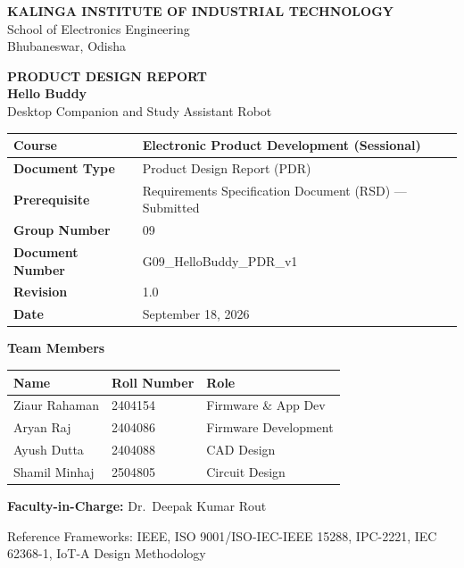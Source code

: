 \documentclass[12pt,a4paper]{article}
\begin{document}
\begin{titlepage}
\begin{center}

\vspace*{1cm}
{\large\bfseries KALINGA INSTITUTE OF INDUSTRIAL TECHNOLOGY}\\[0.2cm]
{\normalsize School of Electronics Engineering}\\[0.2cm]
{\normalsize Bhubaneswar, Odisha}

\vspace{1.5cm}
{\LARGE\bfseries PRODUCT DESIGN REPORT}\\[0.5cm]
{\Large\bfseries Hello Buddy}\\[0.2cm]
{\large Desktop Companion and Study Assistant Robot}

\vspace{1.5cm}
\begin{tabular}{|L{0.35\textwidth}|L{0.50\textwidth}|}
\hline
\textbf{Course} & Electronic Product Development (Sessional) \\ \hline
\textbf{Document Type} & Product Design Report (PDR) \\ \hline
\textbf{Prerequisite} & Requirements Specification Document (RSD) --- Submitted \\ \hline
\textbf{Group Number} & 09 \\ \hline
\textbf{Document Number} & G09\_HelloBuddy\_PDR\_v1 \\ \hline
\textbf{Revision} & 1.0 \\ \hline
\textbf{Date} & September 18, 2026 \\ \hline
\end{tabular}

\vspace{1cm}
\textbf{Team Members}

\begin{tabular}{|L{0.40\textwidth}|L{0.25\textwidth}|L{0.20\textwidth}|}
\hline
\textbf{Name} & \textbf{Roll Number} & \textbf{Role} \\ \hline
Ziaur Rahaman & 2404154 & Firmware \& App Dev \\ \hline
Aryan Raj & 2404086 & Firmware Development \\ \hline
Ayush Dutta & 2404088 & CAD Design \\ \hline
Shamil Minhaj & 2504805 & Circuit Design \\ \hline
\end{tabular}

\vspace{1cm}
\textbf{Faculty-in-Charge:} Dr.\ Deepak Kumar Rout

\vfill
{\small Reference Frameworks: IEEE, ISO 9001/ISO-IEC-IEEE 15288, IPC-2221,
IEC 62368-1, IoT-A Design Methodology}

\end{center}
\end{titlepage}
\end{document}
